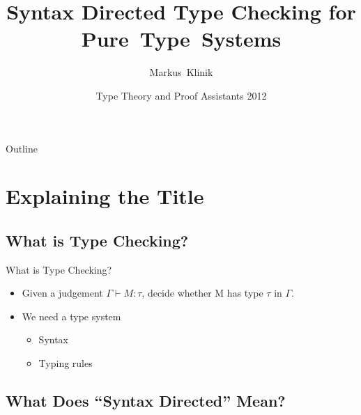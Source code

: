 \documentclass{beamer}
\title
{Syntax Directed Type Checking for Pure~Type~Systems}
\author
{Markus~Klinik}
\institute[Radboud University Nijmegen] %
{
  Radboud University Nijmegen
}
\date
{Type Theory and Proof Assistants 2012}
\begin{document}
\begin{frame}
  \titlepage
\end{frame}

\begin{frame}{Outline}
  \tableofcontents
\end{frame}





\section{Explaining the Title}

\subsection{What is Type Checking?}


\begin{frame}{What is Type Checking?}

  \begin{itemize}
    \item
      Given a judgement $\Gamma \vdash M : \tau$, decide whether M has type
      $\tau$ in $\Gamma$.
    \item
      We need a type system
      \begin{itemize}
        \item
          Syntax
        \item
          Typing rules
      \end{itemize}
  \end{itemize}

\end{frame}


\subsection{What Does ``Syntax Directed'' Mean?}
\end{document}
